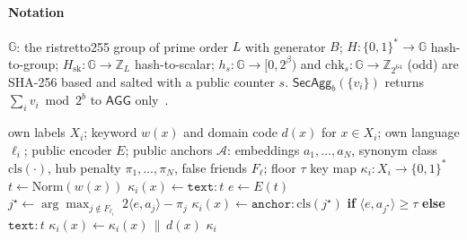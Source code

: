 \algrenewcommand{}
\algrenewcommand{}
\providecommand{\Agg}{\mathsf{AGG}}
\newcommand{\SecAgg}{\mathsf{SecAgg}}
\newcommand{\sample}{\xleftarrow{\$}}

\paragraph*{Notation} $\mathbb{G}$: the ristretto255 group of prime order $L$ with generator $B$;
$H:\{0,1\}^*\to\mathbb{G}$ hash-to-group; $H_{\mathrm{sk}}:\mathbb{G}\to\mathbb{Z}_L$ hash-to-scalar;
$h_s:\mathbb{G}\to[0,2^\beta)$ and $\mathrm{chk}_s:\mathbb{G}\to\mathbb{Z}_{2^{64}}$ (odd) are
SHA-256 based and salted with a public counter $s$. $\SecAgg_{b}(\{v_i\})$ returns $\sum_i v_i
\bmod 2^b$ to $\Agg$ only~\cite{bonawitz2017practical}.

\begin{algorithm}[t]
\caption{$\mathsf{AnchorKey}$: local label key (fuzzy union), run by client $c_i$}
\label{alg:anchor}
\begin{algorithmic}[1]
\Require own labels $X_i$; keyword $w(x)$ and domain code $d(x)$ for $x\in X_i$; own language
  $\ell_i$; public encoder $E$; public anchors $\mathcal{A}$: embeddings $a_1,\dots,a_N$, synonym
  class $\mathrm{cls}(\cdot)$, hub penalty $\pi_1,\dots,\pi_N$, false friends $F_{\ell}$; floor $\tau$
\Ensure key map $\kappa_i: X_i\to\{0,1\}^*$
  \State $t\gets\mathrm{Norm}(w(x))$ 
    \State $\kappa_i(x)\gets \texttt{text:}\,t$ 
  \Else
    \State $e\gets E(t)$
    \State $j^\star\gets\arg\max_{j\notin F_{\ell_i}}\; 2\langle e,a_j\rangle-\pi_j$ 
    \State $\kappa_i(x)\gets \texttt{anchor:}\,\mathrm{cls}(j^\star)$ \textbf{if} $\langle e,a_{j^\star}\rangle\ge\tau$ \textbf{else} $\texttt{text:}\,t$
  \EndIf
  \State $\kappa_i(x)\gets\kappa_i(x)\,\|\,d(x)$
\EndFor
\State \Return $\kappa_i$ 
\end{algorithmic}
\end{algorithm}

